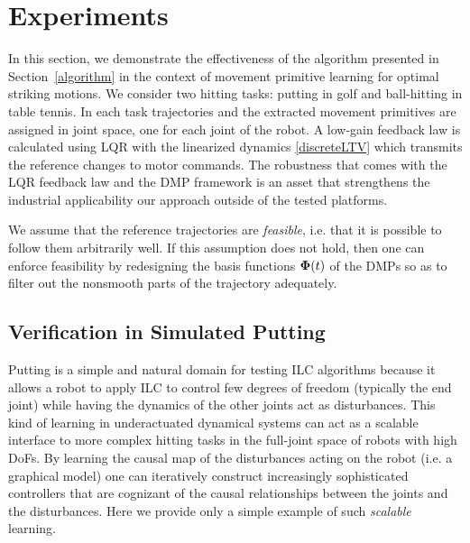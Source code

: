 \section{Experiments}\label{experiments}


In this section, we demonstrate the effectiveness of the algorithm presented in Section~\ref{algorithm} in the context of movement primitive learning for optimal striking motions. We consider two hitting tasks: putting in golf and ball-hitting in table tennis. In each task trajectories and the extracted movement primitives are assigned in joint space, one for each joint of the robot. A low-gain feedback law is calculated using LQR with the linearized dynamics \eqref{discreteLTV} which transmits the reference changes to motor commands. The robustness that comes with the LQR feedback law and the DMP framework is an asset that strengthens the industrial applicability our approach outside of the tested platforms.

We assume that the reference trajectories are \emph{feasible}, i.e. that it is possible to follow them arbitrarily well. If this assumption does not hold, then one can enforce feasibility by redesigning the basis functions $\boldsymbol{\mathrm{\Phi}}(t)$ of the DMPs so as to filter out the nonsmooth parts of the trajectory adequately.

\subsection{Verification in Simulated Putting}

Putting is a simple and natural domain for testing ILC algorithms because it allows a robot to apply ILC to control few degrees of freedom (typically the end joint) while having the dynamics of the other joints act as disturbances. This kind of learning in underactuated dynamical systems can act as a scalable interface to more complex hitting tasks in the full-joint space of robots with high DoFs. By learning the causal map of the disturbances acting on the robot (i.e. a graphical model) one can iteratively construct increasingly sophisticated controllers that are cognizant of the causal relationships between the joints and the disturbances. Here we provide only a simple example of such \emph{scalable} learning. 


